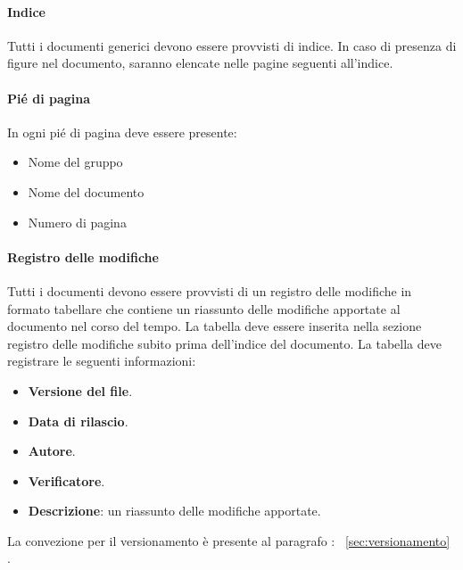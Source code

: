 \documentclass{article}
\begin{document}
\begin{enumerate}
\paragraph*{Indice}
Tutti i documenti generici devono essere provvisti di indice.
In caso di presenza di figure nel documento, saranno elencate nelle pagine seguenti all'indice.
\paragraph*{Pié di pagina}
In ogni pié di pagina deve essere presente:
\begin{itemize}
    \item Nome del gruppo
    \item Nome del documento
    \item Numero di pagina
\end{itemize}
\paragraph*{Registro delle modifiche}\label{sec:RegistroModifiche}
Tutti i documenti devono essere provvisti di un registro delle modifiche in formato tabellare che contiene un riassunto
delle modifiche apportate al documento nel corso del tempo.
La tabella  deve essere inserita nella
sezione registro delle modifiche subito prima dell’indice del documento.
La tabella deve registrare le seguenti informazioni:
\begin{itemize}
    \item \textbf{Versione del file}.
    \item \textbf{Data di rilascio}.
    \item \textbf{Autore}.
    \item \textbf{Verificatore}.
    \item \textbf{Descrizione}: un riassunto delle modifiche apportate.
\end{itemize}
La convezione per il versionamento è presente al paragrafo : ~\ref{sec:versionamento} .

\end{enumerate}
\end{document}
